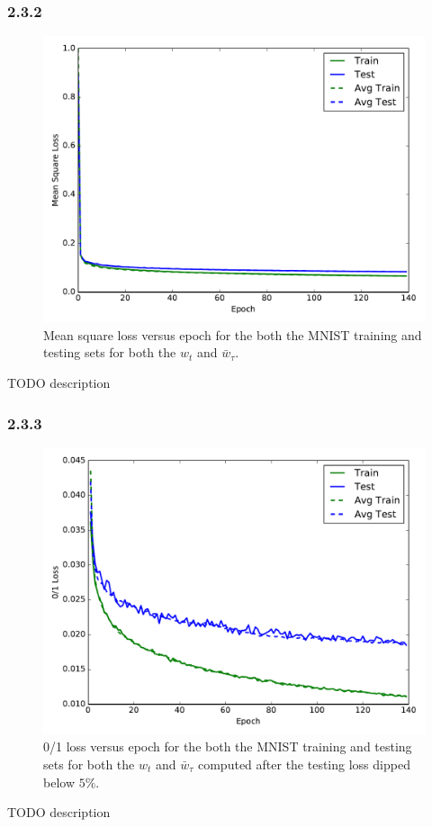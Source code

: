 \documentclass[12pt]{amsart}
\begin{document}
\subsubsection*{2.3.2}
\begin{figure}[H]
	\includegraphics[width=\columnwidth]{nn_square_loss.pdf}
    \caption{Mean square loss versus epoch for the both the MNIST training and testing sets for both the $w_t$ and $\bar{w}_{\tau}$.}
    \label{fig:nn_square_loss}
\end{figure}
TODO description

\subsubsection*{2.3.3}
\begin{figure}[H]
	\includegraphics[width=\columnwidth]{nn_01_loss_masked.pdf}
    \caption{0/1 loss versus epoch for the both the MNIST training and testing sets for both the $w_t$ and $\bar{w}_{\tau}$ computed after the testing loss dipped below $5\%$.}
    \label{fig:nn_01_loss_masked}
\end{figure}
TODO description
\end{document}
